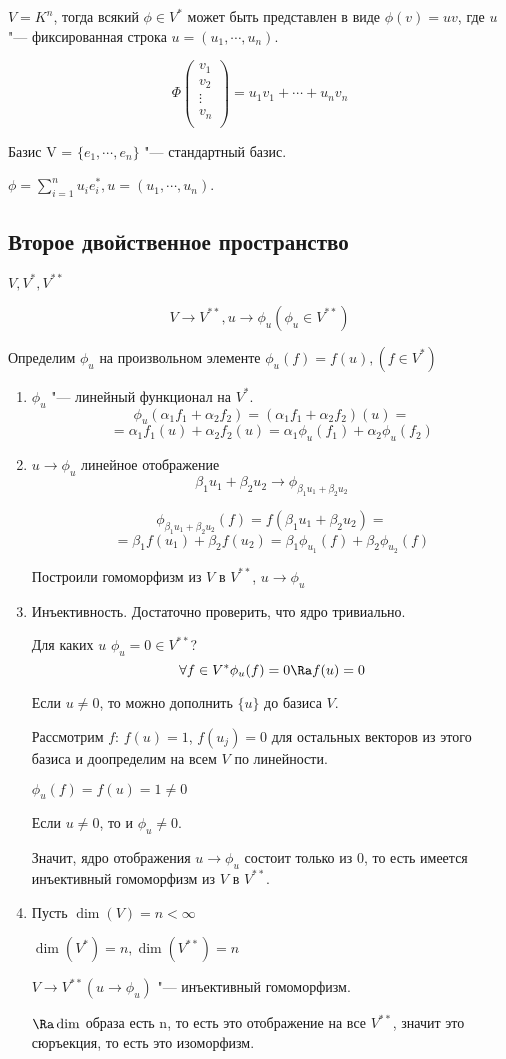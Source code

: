 \begin{Rem}
$V = K^n$, тогда всякий $\phi \in V^{*}$ 
может быть представлен в виде $\phi(v) = uv$, где 
$u$ "--- фиксированная строка $u = (u_1, \cdots, u_n)$.

$$
\Phi\begin{pmatrix}
v_1\\
v_2\\
\vdots\\
v_n\\
\end{pmatrix} = u_1v_1 + \cdots + u_nv_n
$$

Базис V = $\{e_1, \cdots, e_n\}$ "--- стандартный базис.

$\phi = \sum_{i = 1}^{n}u_ie_i^{*}, u = (u_1, \cdots, u_n)$.
\end{Rem}

\subsection{Второе двойственное пространство}
$V, V^*, V^{**}$

$$V \to V^{**}, u \to \phi_u (\phi_u \in V^{**})$$

Определим $\phi_u$ на произвольном элементе $\phi_u(f) = f(u), (f \in V^*)$

\begin{enumerate}
\item $\phi_u$ "--- линейный функционал на $V^*$.
$$\phi_u(\alpha_1f_1 + \alpha_2f_2) = (\alpha_1f_1 + \alpha_2f_2)(u) = $$
$$= \alpha_1f_1(u) + \alpha_2f_2(u) = \alpha_1\phi_u(f_1) + \alpha_2\phi_u(f_2)$$
\item $u \to \phi_u$ линейное отображение
$$\beta_1u_1 + \beta_2u_2 \to \phi_{\beta_1u_1 + \beta_2u_2}$$

$$\phi_{\beta_1u_1 + \beta_2u_2}(f) = f(\beta_1u_1 + \beta_2u_2) = $$
$$= \beta_1f(u_1) + \beta_2f(u_2) = \beta_1 \phi_{u_1}(f) + \beta_2\phi_{u_2}(f)$$

Построили гомоморфизм из $V$  в $V^{**}$, $u \to \phi_u$
\item Инъективность. Достаточно проверить, что ядро тривиально. 

Для каких $u$ $\phi_u = 0 \in V^{**}$?
$$\forall f \in V^* \phi_u(f) = 0 \Ra f(u) = 0 $$

Если $u \ne 0$, то можно дополнить $\{u\}$ до базиса $V$.

Рассмотрим $f$: $f(u) = 1$, $f(u_j) = 0$ для остальных
векторов из этого базиса и доопределим на всем $V$ по линейности.

$\phi_u(f) = f(u) = 1 \ne 0$

Если $u \ne 0$, то и $\phi_u \ne 0$.

Значит, ядро отображения $u \to \phi_u$ состоит только из 0, 
то есть имеется инъективный гомоморфизм из $V$ в $V^{**}$.
\item Пусть $\dim(V) = n < \infty$

$\dim(V^{*}) = n, \dim(V^{**}) = n$

$V \to V^{**}(u \to \phi_u)$ "--- инъективный гомоморфизм.

$\Ra \dim$ образа есть n,  то есть это отображение на все $V^{**}$,
значит это сюръекция, то есть это изоморфизм.  
\end{enumerate}


